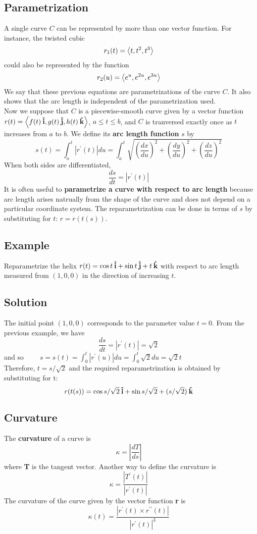 \subsection*{Parametrization}
A single curve $C$ can be represented by more than one vector function. For instance, the twisted cubic $$r_1(t) = \ev{t, t^2, t^3}$$
could also be represented by the function $$r_2(u) = \ev{e^u, e^{2u}, e^{3u}}$$
We say that these previous equations are parametrizations of the curve $C$. It also shows that the arc length is independent of the parametrization used. \\
Now we suppose that $C$ is a piecewise-smooth curve given by a vector function $r(t) = \ev{f(t)\ihat, g(t)\jhat, h(t)\khat}$, $a\leq t\leq b$, and $C$ is tranversed exactly once as $t$ increases from $a$ to $b$. We define its \textbf{arc length function} $s$ by
$$s(t) = \int^t_a |r^\prime(t)| du = \int^t_a \sqrt{(\frac{dx}{du})^2 + (\frac{dy}{du})^2 + (\frac{dz}{du})^2}$$
When both sides are differentiated, $$\frac{ds}{dt} = |r^\prime(t)|$$
It is often useful to \textbf{parametrize a curve with respect to arc length} because arc length arises natrually from the shape of the curve and does not depend on a particular
coordinate system. The reparametrization can be done in terms of $s$  by substituting for $t$: $r = r(t(s))$. 

\subsection*{Example}
Reparametrize the helix $r(t) = \cos{t}\:\boldsymbol{\hat{\textbf{i}}} + \sin{t}\:\boldsymbol{\hat{\textbf{j}}} + t\:\boldsymbol{\hat{\textbf{k}}}$ with respect to arc length measured from $(1, 0, 0)$ in the direction of increasing $t$.
\subsection*{Solution}
The initial point $(1, 0, 0)$ corresponds to the parameter value $t = 0$. From the previous example, we have 
$$\frac{ds}{dt} = |r^\prime(t)| = \sqrt{2}$$ and so $\qquad s = s(t) = \int^t_0 |r^\prime(u)| du = \int^t_0 \sqrt{2} du = \sqrt{2}t$\\
Therefore, $t = s/\sqrt{2}$ and the required reparametrization is obtained by substituting for t: $$r(t(s)) = \cos{s/\sqrt{2}}\:\boldsymbol{\hat{\textbf{i}}} + \sin{s/\sqrt{2}} + (s/\sqrt{2})\:\boldsymbol{\hat{\textbf{k}}}$$

\subsection*{Curvature}
The \textbf{curvature} of a curve is $$\kappa = |\frac{dT}{ds}|$$ where \textbf{T} is the tangent vector. Another way to define the curvature is 
$$\kappa = \frac{|T^\prime(t)|}{|r^\prime(t)|}$$
The curvature of the curve given by the vector function \textbf{r} is $$\kappa(t) = \frac{|r^\prime(t)\times r^{\prime\prime}(t)|}{|r^\prime(t)|^3}$$

